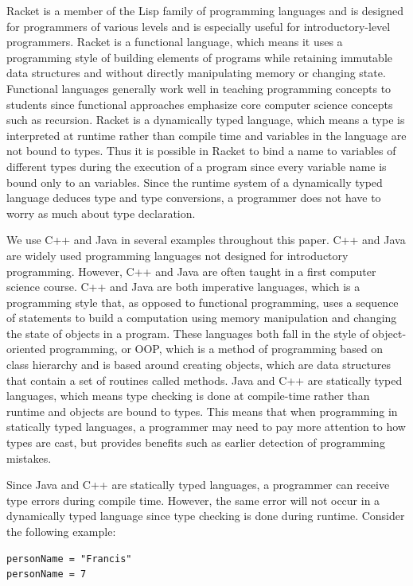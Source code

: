 \documentclass{sig-alternate}
\begin{document}
Racket is a member of the Lisp family of programming languages and is designed for programmers of various levels and is especially useful for introductory-level programmers.
Racket is a functional language, which means it uses a programming style of building elements of programs while retaining immutable data structures 
and without directly manipulating memory or changing state.
Functional languages generally work well in teaching programming concepts to students since functional approaches emphasize core computer science concepts such as recursion.
Racket is a dynamically typed language, which means a type is interpreted at runtime rather than compile time and variables in the language are not bound to types.
Thus it is possible in Racket to bind a name to variables of different types during the execution of a program since every variable name is bound only to an variables.
Since the runtime system of a dynamically typed language deduces type and type conversions, a programmer does not have to worry as much about type declaration.

We use C++ and Java in several examples throughout this paper.
C++ and Java are widely used programming languages not designed for introductory programming.
However, C++ and Java are often taught in a first computer science course.
C++ and Java are both imperative languages, which is a programming style that, as opposed to functional programming, uses a sequence of statements to build a computation using memory manipulation and changing the state of objects in a program.
These languages both fall in the style of object-oriented programming, or OOP, which is a method of programming based on class hierarchy and is based around creating objects, which are data structures that contain a set of routines called methods. 
Java and C++ are statically typed languages, which means type checking is done at compile-time rather than runtime and objects are bound to types. 
This means that when programming in statically typed languages, a programmer may need to pay more attention to how types are cast, but provides benefits such as earlier detection of programming mistakes.

Since Java and C++ are statically typed languages, a programmer can receive type errors during compile time.
However, the same error will not occur in a dynamically typed language since type checking is done during runtime.
Consider the following example:

\begin{verbatim}
personName = "Francis"
personName = 7
\end{verbatim}
\end{document}

